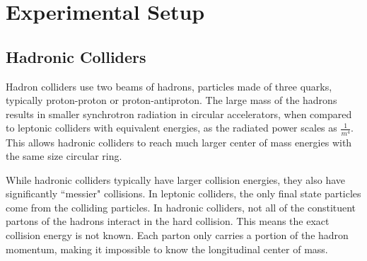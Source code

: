\chapter{Experimental Setup}
\section{Hadronic Colliders}
Hadron colliders use two beams of hadrons, particles made of three quarks, typically proton-proton or proton-antiproton. The large mass of the hadrons results in smaller synchrotron radiation in circular accelerators, when compared to leptonic colliders with equivalent energies, as the radiated power scales as ${\frac{1}{m^{4}}}$. This allows hadronic colliders to reach much larger center of mass energies with the same size circular ring. \newline

\indent While hadronic colliders typically have larger collision energies, they also have significantly ``messier" collisions. In leptonic colliders, the only final state particles come from the colliding particles. In hadronic colliders, not all of the constituent partons of the hadrons interact in the hard collision. This means the exact collision energy is not known. Each parton only carries a portion of the hadron momentum, making it impossible to know the longitudinal center of mass. 



